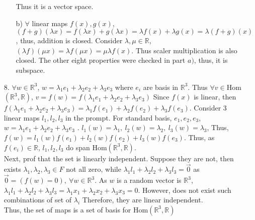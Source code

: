 \documentclass{article}
\begin{document}
\begin{itemize}
\begin{itemize}
\begin{itemize}
        \end{itemize}
        Thus it is a vector space.
        \item [b)] \(\forall\) linear maps \(f(x),g(x)\), \((f+g)(\lambda x) = f(\lambda x)+g(\lambda x)= \lambda f(x)+\lambda g(x) = \lambda (f+g)(x)\), thus, addition is closed.
        Consider \(\lambda,\mu\in\mathbb{R}\), \((\lambda f)(\mu x) = \lambda f(\mu x)= \mu\lambda f(x)\). Thus scaler multiplication is also closed.
        The other eight properties were checked in part \(a)\), thus, it is subspace.
    \end{itemize}
    \item [8.] \(\forall w \in \mathbb{R}^3\), \(w = \lambda_1e_1+\lambda_2e_2+\lambda_3e_3\) where \(e_i\) are basis in \(\mathbb{R}^3\). Thus \(\forall v\in\)Hom\((\mathbb{R}^3,\mathbb{R})\), 
    \(v =f(w) =  f(\lambda_1e_1+\lambda_2e_2+\lambda_3e_3)\) Since \(f(x)\) is linear, then \(f(\lambda_1e_1+\lambda_2e_2+\lambda_3e_3) = \lambda_1f(e_1)+\lambda_2f(e_2)+\lambda_3f(e_3)\).
    Consider 3 linear maps \(l_1,l_2,l_3\) in the prompt. For standard basis, \(e_1,e_2,e_3\), \(w =  \lambda_1e_1+\lambda_2e_2+\lambda_3e_3\)
    . \(l_1(w)=\lambda_1,\ l_2(w)=\lambda_2,\ l_3(w)=\lambda_3\), Thus, \(f(w) = l_1(w)f(e_1)+l_2(w)f(e_2)+l_3(w)f(e_3)\). 
    Thus, as \(f(e_i)\in\mathbb{R}\), \(l_1,l_2,l_3\) do span Hom\((\mathbb{R}^3,\mathbb{R})\).
    \\ Next, prof that the set is linearly independent.
    Suppose they are not, then exists \(\lambda_1,\lambda_2,\lambda_3\in F\) not all zero, while \(\lambda_1l_1+\lambda_2l_2+\lambda_3l_3=\overrightarrow{0}\) as \(\overrightarrow{0}= (f(w)=0),\ \forall w\in\mathbb{R}^3\).
    As \(w\) is a random vector is \(\mathbb{R}^3\), \(\lambda_1l_1+\lambda_2l_2+\lambda_3l_3 = \lambda_1x_1+\lambda_2x_2+\lambda_3x_3=0\). However, does not exist such combinations of set of \(\lambda_i\)
    Therefore, they are linear independent.\\
    Thus, the set of maps is a set of basis for Hom\((\mathbb{R}^3,\mathbb{R})\)











\end{itemize}
\end{document}
